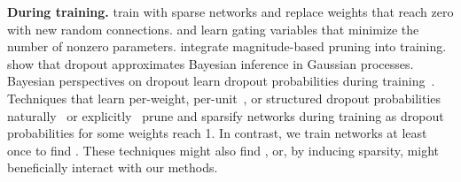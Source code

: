 \textbf{During training.}
\citet{deepr} train with sparse networks and replace weights that reach zero with new random connections.
\citet{sparse-neural-networks} and \citet{l0-reg} learn gating variables that minimize the number of nonzero parameters.
\citet{exploring} integrate magnitude-based pruning into training.
\citet{bayesian-dropout} show that dropout approximates Bayesian inference in Gaussian processes.
Bayesian perspectives on dropout learn dropout probabilities during training~\citep{concrete-dropout, variational-dropout, generalized-dropout}.
Techniques that learn per-weight, per-unit~\citep{generalized-dropout}, or structured dropout probabilities
naturally~\citep{variational-sparsifies, structured-bayesian-pruning}
or explicitly~\citep{bayesian-compression, learning-architectures} prune and sparsify networks during training as dropout probabilities for some weights
reach 1. In contrast, we train networks at least once to find {}. These techniques might also find
{}, or, by inducing sparsity, might beneficially interact with our methods.